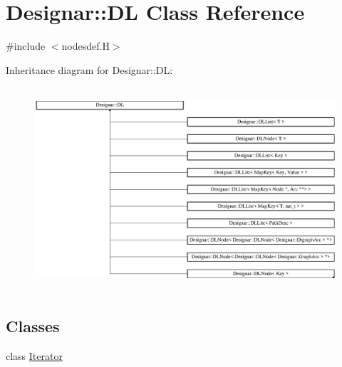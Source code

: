 \hypertarget{class_designar_1_1_d_l}{}\section{Designar\+:\+:DL Class Reference}
\label{class_designar_1_1_d_l}


{\ttfamily \#include $<$nodesdef.\+H$>$}

Inheritance diagram for Designar\+:\+:DL\+:\begin{figure}[H]
\begin{center}
\leavevmode
\includegraphics[height=7.623763cm]{class_designar_1_1_d_l}
\end{center}
\end{figure}
\subsection*{Classes}
\begin{DoxyCompactItemize}
\item 
class \hyperlink{class_designar_1_1_d_l_1_1_iterator}{Iterator}
\end{DoxyCompactItemize}
